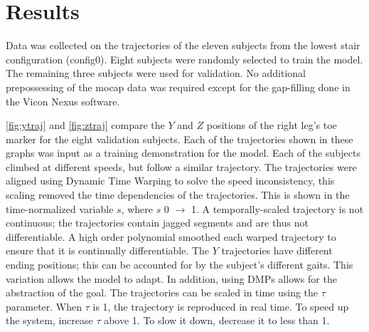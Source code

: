 \section{Results}

Data was collected on the trajectories of the eleven subjects from the lowest stair configuration (config0). Eight subjects were randomly selected to train the model. The remaining three subjects were used for validation. No additional prepossessing of the mocap data was required except for the gap-filling done in the Vicon Nexus software. 

\autoref{fig:ytraj} and \autoref{fig:ztraj} compare the $Y$ and $Z$ positions of the right leg's toe marker for the eight validation subjects. Each of the trajectories shown in these graphs was input as a training demonstration for the model. Each of the subjects climbed at different speeds, but follow a similar trajectory. The trajectories were aligned using Dynamic Time Warping to solve the speed inconsistency, this scaling removed the time dependencies of the trajectories. This is shown in the time-normalized variable $s$, where $s$ 0 $\rightarrow$ 1. A temporally-scaled trajectory is not continuous; the trajectories contain jagged segments and are thus not differentiable. A high order polynomial smoothed each warped trajectory to ensure that it is continually differentiable. The $Y$ trajectories have different ending positions; this can be accounted for by the subject's different gaits. This variation allows the model to adapt. In addition, using DMPs allows for the abstraction of the goal. The trajectories can be scaled in time using the $\tau$ parameter. When $\tau$ is 1, the trajectory is reproduced in real time. To speed up the system, increase $\tau$ above 1. To slow it down, decrease it to less than 1.  

